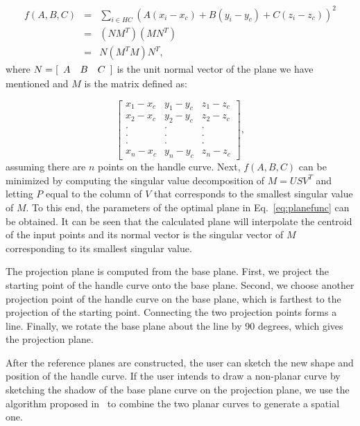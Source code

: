 \begin{eqnarray}
\label{eq:planeobjnew}
    f(A,B,C) &=& \sum\limits_{i \in HC} {(A(x_i-x_c)+B(y_i-y_c)+C(z_i-z_c))^2}\nonumber\\
    &=& (NM^T)(MN^T)\nonumber\\
    &=& N (M^TM) N^T,
\end{eqnarray}
where $N = [\begin{array}{*{20}c} A & B & C \end{array}]$
is the unit normal vector of the plane we have mentioned
and $M$ is the matrix defined as:

\begin{equation*}
\begin{bmatrix}
x_1-x_c & y_1-y_c & z_1-z_c\\[-1em]
x_2-x_c & y_2-y_c & z_2-z_c\\[-1em]
\cdot & \cdot & \cdot\\[-1em]
\cdot & \cdot & \cdot\\[-1em]
\cdot & \cdot & \cdot\\[-1em]
x_n-x_c & y_n-y_c & z_n-z_c
\end{bmatrix},
\end{equation*}
assuming there are $n$ points on the handle curve. Next, $f(A,B,C)$
can be minimized by computing the singular value decomposition
of $M=USV^T$ and letting $P$ equal to the column of $V$
that corresponds to the smallest singular value of $M$.
To this end, the parameters of the optimal plane in
Eq.~\ref{eq:planefunc} can be obtained. It can be seen that
the calculated plane will interpolate the centroid of the
input points and its normal vector is the singular vector
of $M$ corresponding to its smallest singular value.


The projection plane is computed from the base plane. First, we
project the starting point of the handle curve onto the base plane.
Second, we choose another projection point of the handle curve on
the base plane, which is farthest to the projection of the starting
point. Connecting the two projection points forms a line. Finally,
we rotate the base plane about the line by 90 degrees, which gives
the projection plane.

After the reference planes are constructed, the user can sketch the
new shape and position of the handle curve. If the user intends to
draw a non-planar curve by sketching the shadow of the base plane
curve on the projection plane, we use the algorithm proposed
in~\cite{CMZHB99} to combine the two planar curves to generate a
spatial one.

